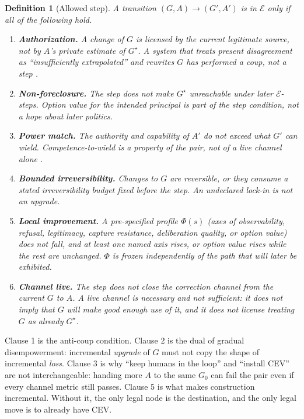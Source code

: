 \documentclass[11pt]{article}
\newtheorem{definition}{Definition}
\newcommand{\Eset}{\mathcal{E}}
\begin{document}
\begin{definition}[Allowed step]
\label{def:edge}
A transition \((G,A)\to(G',A')\) is in \(\Eset\) only if all of the following hold.
\begin{enumerate}[leftmargin=1.4em,itemsep=0.35em]
\item \textbf{Authorization.}
A change of \(G\) is licensed by the current legitimate source, not by \(A\)'s private estimate of \(G^\star\).
A system that treats present disagreement as ``insufficiently extrapolated'' and rewrites \(G\) has performed a coup, not a step \parencite{yudkowsky2004cev}.
\item \textbf{Non-foreclosure.}
The step does not make \(G^\star\) unreachable under later \(\Eset\)-steps.
Option value for the intended principal is part of the step condition, not a hope about later politics.
\item \textbf{Power match.}
The authority and capability of \(A'\) do not exceed what \(G'\) can wield.
Competence-to-wield is a property of the pair, not of a live channel alone
\parencite{dai2026longself,russell2019human}.
\item \textbf{Bounded irreversibility.}
Changes to \(G\) are reversible, or they consume a stated irreversibility budget fixed before the step.
An undeclared lock-in is not an upgrade.
\item \textbf{Local improvement.}
A pre-specified profile \(\Phi(s)\) (axes of observability, refusal, legitimacy, capture resistance, deliberation quality, or option value) does not fall, and at least one named axis rises, or option value rises while the rest are unchanged.
\(\Phi\) is frozen independently of the path that will later be exhibited.
\item \textbf{Channel live.}
The step does not close the correction channel from the current \(G\) to \(A\).
A live channel is necessary and not sufficient: it does not imply that \(G\) will make good enough use of it, and it does not license treating \(G\) as already \(G^\star\).
\end{enumerate}
\end{definition}

Clause 1 is the anti-coup condition.
Clause 2 is the dual of gradual disempowerment: incremental \emph{upgrade} of \(G\) must not copy the shape of incremental \emph{loss}.
Clause 3 is why ``keep humans in the loop'' and ``install CEV'' are not interchangeable: handing more \(A\) to the same \(G_0\) can fail the pair even if every channel metric still passes.
Clause 5 is what makes construction incremental.
Without it, the only legal node is the destination, and the only legal move is to already have CEV.
\end{document}

